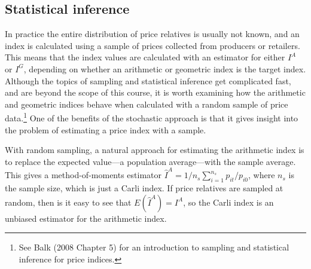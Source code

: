 \documentclass[]{article}
\begin{document}
\hypertarget{statistical-inference}{%
\subsection{Statistical inference}\label{statistical-inference}}

In practice the entire distribution of price relatives is usually not known, and an index is calculated using a sample of prices collected from producers or retailers. This means that the index values are calculated with an estimator for either \(I^{A}\) or \(I^{G}\), depending on whether an arithmetic or geometric index is the target index. Although the topics of sampling and statistical inference get complicated fast, and are beyond the scope of this course, it is worth examining how the arithmetic and geometric indices behave when calculated with a random sample of price data.\footnote{See Balk (2008 Chapter 5) for an introduction to sampling and statistical inference for price indices.} One of the benefits of the stochastic approach is that it gives insight into the problem of estimating a price index with a sample.

With random sampling, a natural approach for estimating the arithmetic index is to replace the expected value---a population average---with the sample average. This gives a method-of-moments estimator \(\hat{I}^A = 1 / n_{s} \sum_{i = 1}^{n_{s}} p_{it} / p_{i0}\), where \(n_{s}\) is the sample size, which is just a Carli index. If price relatives are sampled at random, then is it easy to see that \(E(\hat{I}^{A}) = I^{A}\), so the Carli index is an unbiased estimator for the arithmetic index.
\end{document}
